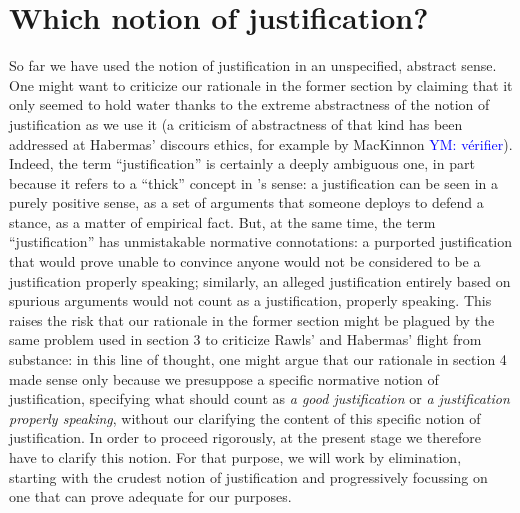\documentclass[preprint, french, english, 11pt, authoryear]{elsarticle}%
\newcommand{\commentYM}[1]{\textcolor{blue}{YM: #1}}
\begin{document}
\section{Which notion of justification?}
So far we have used the notion of justification in an unspecified, abstract sense. One might want to criticize our rationale in the former section by claiming that it only seemed to hold water thanks to the extreme abstractness of the notion of justification as we use it (a criticism of abstractness of that kind has been addressed at Habermas' discours ethics, for example by MacKinnon \commentYM{vérifier}). Indeed, the term ``justification'' is certainly a deeply ambiguous one, in part because it refers to a ``thick'' concept in \citet{williams_ethics_1985}'s sense: a justification can be seen in a purely positive sense, as a set of arguments that someone deploys to defend a stance, as a matter of empirical fact. But, at the same time, the term ``justification'' has unmistakable normative connotations: a purported justification that would prove unable to convince anyone would not be considered to be a justification properly speaking; similarly, an alleged justification entirely based on spurious arguments would not count as a justification, properly speaking. This raises the risk that our rationale in the former section might be plagued by the same problem used in section 3 to criticize Rawls' and Habermas' flight from substance: in this line of thought, one might argue that our rationale in section 4 made sense only because we presuppose a specific normative notion of justification, specifying what should count as \emph{a good justification} or \emph{a justification properly speaking}, without our clarifying the content of this specific notion of justification. In order to proceed rigorously, at the present stage we therefore have to clarify this notion. For that purpose, we will work by elimination, starting with the crudest notion of justification and progressively focussing on one that can prove adequate for our purposes.
\end{document}
